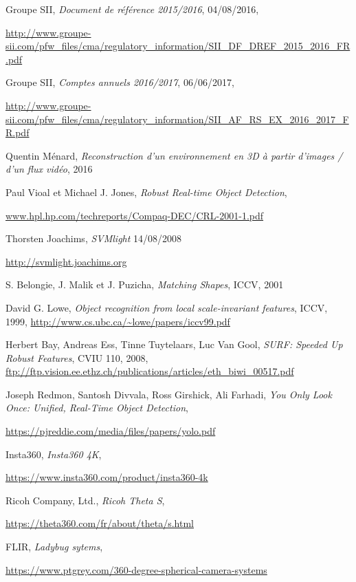 \begin{thebibliography}{9}

		Groupe SII,
		\emph{Document de référence 2015/2016},
		04/08/2016,
		\par
		\url{http://www.groupe-sii.com/pfw_files/cma/regulatory_information/SII_DF_DREF_2015_2016_FR.pdf}
	
		Groupe SII,
		\emph{Comptes annuels 2016/2017},
		06/06/2017,
		\par
		\url{http://www.groupe-sii.com/pfw_files/cma/regulatory_information/SII_AF_RS_EX_2016_2017_FR.pdf}
	
		Quentin Ménard,
		\emph{Reconstruction d’un environnement en 3D à partir d’images / d’un flux vidéo},
		2016
	
		Paul Vioal et Michael J. Jones,
		\emph{Robust Real-time Object Detection},
		\par
		\url{www.hpl.hp.com/techreports/Compaq-DEC/CRL-2001-1.pdf}
	
		Thorsten Joachims,
		\emph{SVMlight}
		14/08/2008
		\par
		\url{http://svmlight.joachims.org}
	
		S. Belongie, J. Malik et J. Puzicha,
		\emph{Matching Shapes},
		ICCV,
		2001

		David G. Lowe,
		\emph{Object recognition from local scale-invariant features},
		ICCV,
		1999,
		\url{http://www.cs.ubc.ca/~lowe/papers/iccv99.pdf}

		Herbert Bay, Andreas Ess, Tinne Tuytelaars, Luc Van Gool,
		\emph{SURF: Speeded Up Robust Features},
		CVIU 110,
		2008,
		\url{ftp://ftp.vision.ee.ethz.ch/publications/articles/eth_biwi_00517.pdf}
	
		Joseph Redmon, Santosh Divvala, Ross Girshick, Ali Farhadi,
		\emph{You Only Look Once: Unified, Real-Time Object Detection},
		\par
		\url{https://pjreddie.com/media/files/papers/yolo.pdf}
	
		Insta360,
		\emph{Insta360 4K},
		\par
		\url{https://www.insta360.com/product/insta360-4k}
	
		Ricoh Company, Ltd.,
		\emph{Ricoh Theta S},
		\par
		\url{https://theta360.com/fr/about/theta/s.html}
	
		FLIR,
		\emph{Ladybug sytems},
		\par
		\url{https://www.ptgrey.com/360-degree-spherical-camera-systems}
		

\end{thebibliography}

